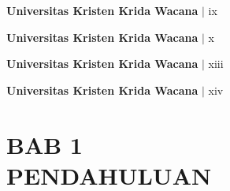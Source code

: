 \documentclass[12pt,a4paper]{article}
\newcommand{\ukrida}{Universitas Kristen Krida Wacana}
\numberwithin{equation}{section}
\begin{document}
\vfill
\begin{flushright}
  \footnotesize\textbf{\ukrida} $|$ ix
\end{flushright}

\newpage
\thispagestyle{frontmatter}
\renewcommand{\contentsname}{DAFTAR ISI}
\tableofcontents
{}

\vfill
\begin{flushright}
  \footnotesize\textbf{\ukrida} $|$ x
\end{flushright}

\newpage
\thispagestyle{frontmatter}
\renewcommand{\listtablename}{DAFTAR TABEL}
\listoftables
{}

\vfill
\begin{flushright}
  \footnotesize\textbf{\ukrida} $|$ xiii
\end{flushright}

\newpage
\thispagestyle{frontmatter}
\renewcommand{\listfigurename}{DAFTAR GAMBAR}
\listoffigures
{}

\vfill
\begin{flushright}
  \footnotesize\textbf{\ukrida} $|$ xiv
\end{flushright}

\newpage
{}
\pagestyle{fancy}

\setcounter{section}{0}
\section*{BAB 1\\[0.3cm]PENDAHULUAN}
\setcounter{section}{1}
\setcounter{subsection}{0}
\end{document}
